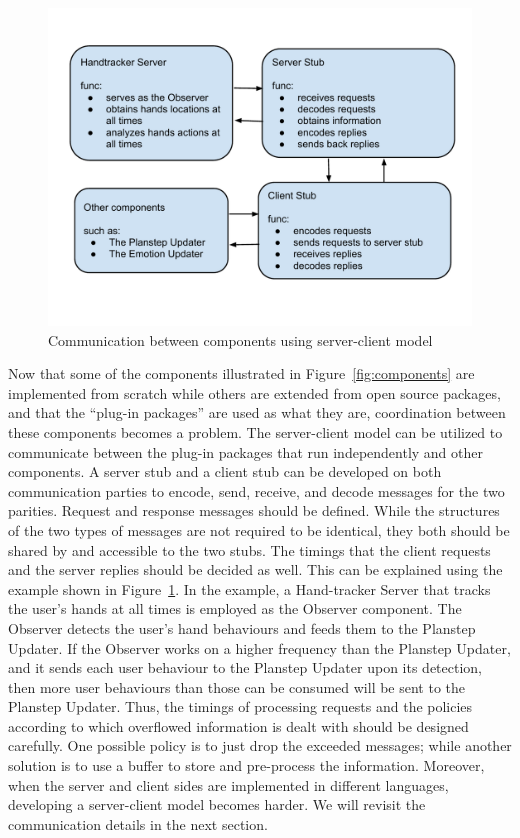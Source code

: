 \begin{figure}[h!]
\centering
\includegraphics[width=0.9\linewidth]{fig-communication.pdf}
\caption{Communication between components using server-client model}
\label{fig:communication}
\end{figure}

Now that some of the components illustrated in Figure~\ref{fig:components} are implemented from scratch while others are extended from open source packages, and that the ``plug-in packages'' are used as what they are, coordination between these components becomes a problem. The server-client model can be utilized to communicate between the plug-in packages that run independently and other components. A server stub and a client stub can be developed on both communication parties to encode, send, receive, and decode messages for the two parities. Request and response messages should be defined. While the structures of the two types of messages are not required to be identical, they both should be shared by and accessible to the two stubs. The timings that the client requests and the server replies should be decided as well. This can be explained using the example shown in Figure~\ref{fig:communication}. In the example, a Hand-tracker Server that tracks the user's hands at all times is employed as the Observer component. The Observer detects the user's hand behaviours and feeds them to the Planstep Updater. If the Observer works on a higher frequency than the Planstep Updater, and it sends each user behaviour to the Planstep Updater upon its detection, then more user behaviours than those can be consumed will be sent to the Planstep Updater. Thus, the timings of processing requests and the policies according to which overflowed information is dealt with should be designed carefully. One possible policy is to just drop the exceeded messages; while another solution is to use a buffer to store and pre-process the information. Moreover, when the server and client sides are implemented in different languages, developing a server-client model becomes harder. We will revisit the communication details in the next section.

